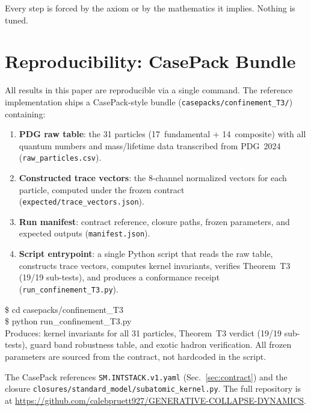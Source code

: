 \documentclass[11pt,a4paper]{article}
\theoremstyle{plain}
\theoremstyle{definition}
\theoremstyle{remark}
\begin{document}
Every step is forced by the axiom or by the mathematics it
implies.  Nothing is tuned.


\section{Reproducibility: CasePack Bundle}\label{sec:casepack}

All results in this paper are reproducible via a single command.
The reference implementation ships a CasePack-style bundle
(\texttt{casepacks/confinement\_T3/}) containing:

\begin{enumerate}
\item \textbf{PDG raw table}: the 31 particles (17~fundamental +
  14~composite) with all quantum numbers and mass/lifetime data
  transcribed from PDG~2024~\cite{pdg2024}
  (\texttt{raw\_particles.csv}).
\item \textbf{Constructed trace vectors}: the 8-channel normalized
  vectors for each particle, computed under the frozen contract
  (\texttt{expected/trace\_vectors.json}).
\item \textbf{Run manifest}: contract reference, closure paths,
  frozen parameters, and expected outputs
  (\texttt{manifest.json}).
\item \textbf{Script entrypoint}: a single Python script that
  reads the raw table, constructs trace vectors, computes kernel
  invariants, verifies Theorem~T3 (19/19 sub-tests), and
  produces a conformance receipt
  (\texttt{run\_confinement\_T3.py}).
\end{enumerate}

\begin{tcolorbox}[
  colback=PreambleBox, colframe=EpsBlue,
  title=One-Command Rerun, fonttitle=\bfseries\small,
  boxrule=0.8pt, arc=2pt, left=8pt, right=8pt
]
\small\ttfamily
\$ cd casepacks/confinement\_T3 \\
\$ python run\_confinement\_T3.py \\[2pt]
\rmfamily\small
Produces: kernel invariants for all 31 particles,
Theorem~T3 verdict (19/19 sub-tests), guard band
robustness table, and exotic hadron verification.
All frozen parameters are sourced from the contract,
not hardcoded in the script.
\end{tcolorbox}

The CasePack references \texttt{SM.INTSTACK.v1.yaml}
(Sec.~\ref{sec:contract}) and the closure
\texttt{closures/standard\_model/subatomic\_kernel.py}.
The full repository is at
\url{https://github.com/calebpruett927/GENERATIVE-COLLAPSE-DYNAMICS}.
\end{document}
